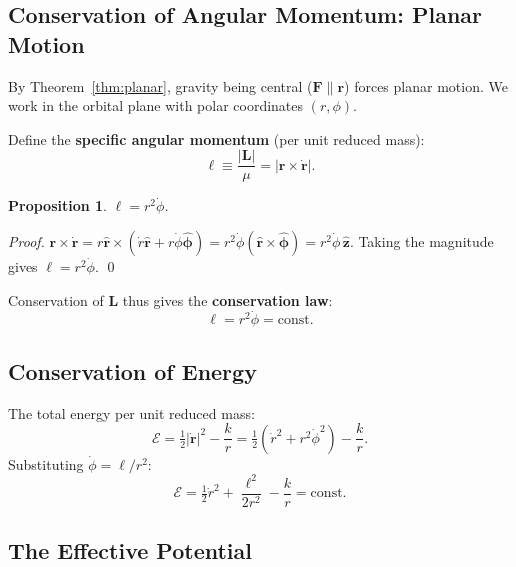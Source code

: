 \documentclass[12pt,a4paper]{article}
\theoremstyle{plain}
\newtheorem{proposition}[theorem]{Proposition}
\theoremstyle{definition}
\theoremstyle{remark}
\newcommand{\ve}[1]{\mathbf{#1}}           %
\newcommand{\he}[1]{\hat{\mathbf{#1}}}     %
\newcommand{\er}{\hat{\mathbf{r}}}
\newcommand{\ep}{\hat{\boldsymbol{\phi}}}
\newcommand{\Lv}{\ve{L}}
\newcommand{\Fv}{\ve{F}}
\newcommand{\rv}{\ve{r}}
\begin{document}
\subsection{Conservation of Angular Momentum: Planar Motion}

By Theorem~\ref{thm:planar}, gravity being central ($\Fv\parallel\rv$) forces planar motion. We work in the orbital plane with polar coordinates $(r,\phi)$.

Define the \textbf{specific angular momentum} (per unit reduced mass):
\[
  \ell \equiv \frac{|\Lv|}{\mu} = |\rv\times\dot{\rv}|.
\]

\begin{proposition}\label{prop:ell}
$\ell = r^2\dot\phi$.
\end{proposition}
\begin{proof}
$\rv\times\dot{\rv} = r\er\times(\dot{r}\er+r\dot\phi\ep) = r^2\dot\phi(\er\times\ep) = r^2\dot\phi\,\he{z}$. Taking the magnitude gives $\ell = r^2\dot\phi$. \qed
\end{proof}

Conservation of $\Lv$ thus gives the \textbf{conservation law}:
\begin{equation}\label{eq:ell-cons}
  \boxed{\ell = r^2\dot\phi = \mathrm{const}.}
\end{equation}

\subsection{Conservation of Energy}

The total energy per unit reduced mass:
\[
  \mathcal{E} = \tfrac{1}{2}|\dot{\rv}|^2 - \frac{k}{r}
  = \tfrac{1}{2}(\dot{r}^2 + r^2\dot\phi^2) - \frac{k}{r}.
\]
Substituting $\dot\phi = \ell/r^2$:
\begin{equation}\label{eq:energy}
  \boxed{\mathcal{E} = \tfrac{1}{2}\dot{r}^2 + \frac{\ell^2}{2r^2} - \frac{k}{r} = \mathrm{const}.}
\end{equation}

\subsection{The Effective Potential}
\end{document}

